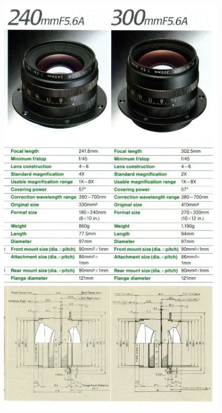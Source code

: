 \documentclass{article}
\begin{document}
\begin{figure}
\centering
\includegraphics[width=\textwidth]{el-nikkor.png}
\end{figure}
\end{document}
